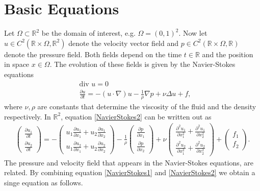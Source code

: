 \documentclass[a4paper,10pt,oneside,final,german,openbib,pdftex,titlepage]{scrbook}
\begin{document}
\section{Basic Equations}
Let $\Omega \subset \mathbb{R}^2$ be the domain of interest, e.g. $\Omega = (0,1)^2$. Now let $u \in C^2(\mathbb{R} \times \Omega,\mathbb{R}^2)$ denote the velocity vector field and $p\in C^2(\mathbb{R} \times \Omega,\mathbb{R})$ denote the pressure field. Both fields depend on the time $t\in \mathbb{R}$ and the position in space $x\in \Omega$. The evolution of these fields is given by the Navier-Stokes equations
\begin{align}
	&\text{div } u = 0 \label{NavierStokes1}
	\\
	&\frac{\partial u}{\partial t} = - (u \cdot \nabla)u - \frac{1}{\rho}\nabla p + \nu \Delta u + f, \label{NavierStokes2}
\end{align}
where $\nu, \rho$ are constants that determine the viscosity of the fluid and the density respectively.
In $\mathbb{R}^2$, equation \ref{NavierStokes2} can be written out as
\begin{align*}
	\left( \begin{matrix}
	\frac{\partial u_1}{\partial t} \\ \frac{\partial u_2}{\partial t}
	\end{matrix} \right) = - \left(\begin{matrix}
	u_1 \frac{\partial u_1}{\partial x_1} + u_2 \frac{\partial u_1}{\partial x_2} \\ u_1 \frac{\partial u_2}{\partial x_1} + u_2 \frac{\partial u_2}{\partial x_2}
	\end{matrix} \right)  - \frac{1}{\rho} \left( \begin{matrix}
	\frac{\partial p}{\partial x_1} \\ \frac{\partial p}{\partial x_2}
\end{matrix}\right)	 + \nu \left( \begin{matrix}
	\frac{\partial^2 u_1}{\partial x_1^2} + \frac{\partial^2 u_1}{\partial x_2^2} \\ \frac{\partial^2 u_2}{\partial x_1^2} + \frac{\partial^2 u_2}{\partial x_2^2}
	\end{matrix} \right) + \left( \begin{matrix}
	f_1 \\ f_2
	\end{matrix} \right).
\end{align*}
The pressure and velocity field that appears in the Navier-Stokes equations, are related. By combining equation \ref{NavierStokes1} and \ref{NavierStokes2} we obtain a singe equation as follows.\\
\end{document}
